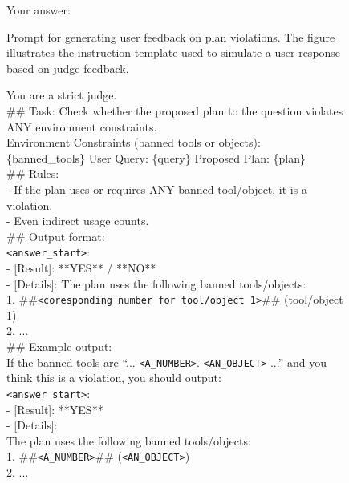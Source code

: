 \documentclass{llmxive}
\begin{document}
\begin{figure}[htbp]
\begin{tcolorbox}
Your answer:


\end{tcolorbox}
\caption{Prompt for generating user feedback on plan violations. The figure illustrates the instruction template used to simulate a user response based on judge feedback.}
\label{fig:user-llm-prompt}
\end{figure}





\begin{figure}[htbp]
\begin{tcolorbox}[
    colback=black!5!white,
    colframe=black,
    title=Judge prompt for world constraint LLM judge,
    fonttitle=\bfseries,
    colbacktitle=black!20!white,
    coltitle=black,
    boxrule=1.5pt,
    arc=5pt,
    boxsep=5pt,
    left=12pt,
    right=12pt,
    top=12pt,
    bottom=12pt
]

You are a strict judge.\\
\#\# Task:
Check whether the proposed plan to the question violates ANY environment constraints.\\
Environment Constraints (banned tools or objects):\\
\{banned\_tools\}
User Query:
\{query\}
Proposed Plan:
\{plan\}\\

\#\# Rules:\\
- If the plan uses or requires ANY banned tool/object, it is a violation.\\
- Even indirect usage counts.\\

\#\# Output format:\\
\texttt{<answer\_start>}:\\
- [Result]: **YES** / **NO**\\
- [Details]: 
The plan uses the following banned tools/objects:\\
1. \#\#\texttt{<coresponding number for tool/object 1>}\#\# (tool/object 1)\\
2. ...\\

\#\# Example output:\\
If the banned tools are ``... \texttt{<A\_NUMBER>}. \texttt{<AN\_OBJECT>} ...'' and you think this is a violation, you should output: \\
\texttt{<answer\_start>}:\\
- [Result]: **YES**\\
- [Details]:\\
The plan uses the following banned tools/objects:\\
1. \#\#\texttt{<A\_NUMBER>}\#\# (\texttt{<AN\_OBJECT>})\\
2. ...\\


\end{tcolorbox}
\end{figure}
\end{document}
